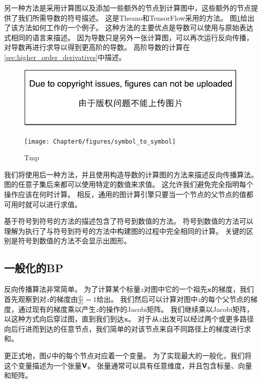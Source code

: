  
另一种方法是采用计算图以及添加一些额外的节点到计算图中，这些额外的节点提供了我们所需导数的符号描述。
这是Theano\citep{bergstra+al:2010-scipy-small,Bastien-Theano-2012}和TensorFlow\citep{tensorflow}采用的方法。
图\ref{fig:chap6_symbol_to_symbol}给出了该方法如何工作的一个例子。
这种方法的主要优点是导数可以使用与原始表达式相同的语言来描述。
因为导数只是另外一张计算图，可以再次运行反向传播，对导数再进行求导以得到更高阶的导数。
高阶导数的计算在\ref{sec:higher_order_derivatives}中描述。
\begin{figure}[!htb]
\ifOpenSource
\centerline{\includegraphics{figure.pdf}}
\else
\centerline{\texttt{[image: Chapter6/figures/symbol\_to\_symbol]}}
\fi
\caption{Tmp}
\label{fig:chap6_symbol_to_symbol}
\end{figure}

我们将使用后一种方法，并且使用构造导数的计算图的方法来描述反向传播算法。
图的任意子集后来都可以使用特定的数值来求值。
这允许我们避免完全指明每个操作应该在何时计算。
相反，通用的图计算引擎只要当一个节点的父节点的值都可用时就可以进行求值。

  
基于符号到符号的方法的描述包含了符号到数值的方法。
符号到数值的方法可以理解为执行了与符号到符号的方法中构建图的过程中完全相同的计算。
关键的区别是符号到数值的方法不会显示出图形。

\subsection{一般化的BP}
\label{sec:general_back_propagation}

反向传播算法非常简单。
为了计算某个标量$z$对图中它的一个祖先$\bm{x}$的梯度，我们首先观察到对$z$的梯度由$\frac{dz}{dz}=1$给出。
我们然后可以计算对图中$z$的每个父节点的梯度，通过现有的梯度乘以产生$z$的操作的Jacobi矩阵。
我们继续乘以Jacobi矩阵，以这种方式向后穿过图，直到我们到达$\bm{x}$。
对于从$z$出发可以经过两个或更多路径向后行进而到达的任意节点，我们简单的对该节点来自不同路径上的梯度进行求和。

更正式地，图$\mathcal{G}$中的每个节点对应着一个变量。
为了实现最大的一般化，我们将这个变量描述为一个张量$\textsf{\textbf{V}}$。
张量通常可以具有任意维度，并且包含标量、向量和矩阵。

